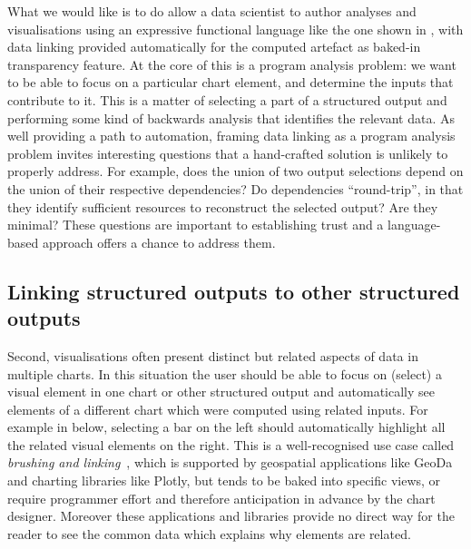 What we would like is to do allow a data scientist to author analyses and visualisations using an expressive functional language like the one shown in , with data linking provided automatically for the computed artefact as baked-in transparency feature. At the core of this is a program analysis problem: we want to be able to focus on a particular chart element, and determine the inputs that contribute to it. This is a matter of selecting a part of a structured output and performing some kind of backwards analysis that identifies the relevant data. As well providing a path to automation, framing data linking as a program analysis problem invites interesting questions that a hand-crafted solution is unlikely to properly address. For example, does the union of two output selections depend on the union of their respective dependencies? Do dependencies ``round-trip'', in that they identify sufficient resources to reconstruct the selected output? Are they minimal? These questions are important to establishing trust and a language-based approach offers a chance to address them.

\subsection{Linking structured outputs to other structured outputs}
\label{sec:introduction:vis-linking}
Second, visualisations often present distinct but related aspects of data in multiple charts. In this situation the user should be able to focus on (select) a visual element in one chart or other structured output and automatically see elements of a different chart which were computed using related inputs. For example in  below, selecting a bar on the left should automatically highlight all the related visual elements on the right. This is a well-recognised use case called \emph{brushing and linking}~\cite{becker87}, which is supported by geospatial applications like GeoDa~\cite{anselin06} and charting libraries like Plotly, but tends to be baked into specific views, or require programmer effort and therefore anticipation in advance by the chart designer. Moreover these applications and libraries provide no direct way for the reader to see the common data which explains why elements are related.

